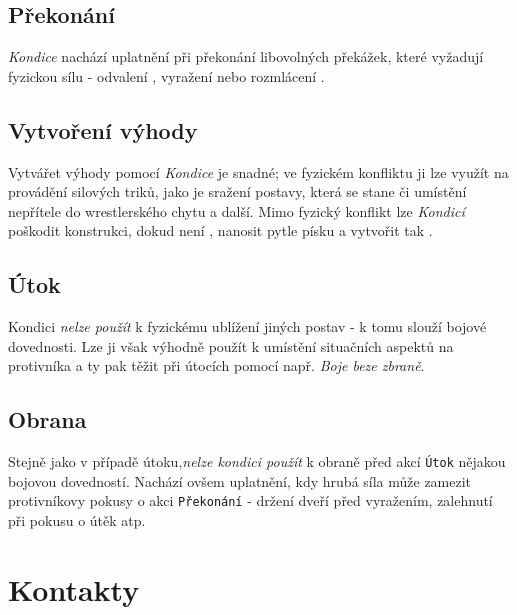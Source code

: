 \documentclass[../main.tex]{subfiles}
\begin{document}
\subsection*{Překonání}
\label{subsec:kondice-prekonani}
\prekonani

\textit{Kondice} nachází uplatnění při překonání libovolných překážek, které vyžadují fyzickou sílu - odvalení , vyražení  nebo rozmlácení . 

\subsection*{Vytvoření výhody}
\label{subsec:kondice-vytvoreni}
\vytvoreni

Vytvářet výhody pomocí \textit{Kondice} je snadné; ve fyzickém konfliktu ji lze využít na provádění silových triků, jako je sražení postavy, která se stane  či umístění nepřítele do wrestlerského chytu  a další. Mimo fyzický konflikt lze \textit{Kondicí} poškodit konstrukci, dokud není , nanosit pytle písku a vytvořit tak .

\subsection*{Útok}
\label{subsec:kondice-utok}
\utok

Kondici \textit{nelze použít} k fyzickému ublížení jiných postav - k tomu slouží bojové dovednosti. Lze ji však výhodně použít k umístění situačních aspektů na protivníka a ty pak těžit při útocích pomocí např. \textit{Boje beze zbraně}.

\subsection*{Obrana}
\label{subsec:kondice-obrana}
\obrana

Stejně jako v případě útoku,\textit{nelze kondici použít} k obraně před akcí \texttt{Útok} nějakou bojovou dovedností. Nachází ovšem uplatnění, kdy hrubá síla může zamezit protivníkovy pokusy o akci \texttt{Překonání} - držení dveří před vyražením, zalehnutí při pokusu o útěk atp.

\section{Kontakty}
\label{sec:kontakty}
\end{document}
